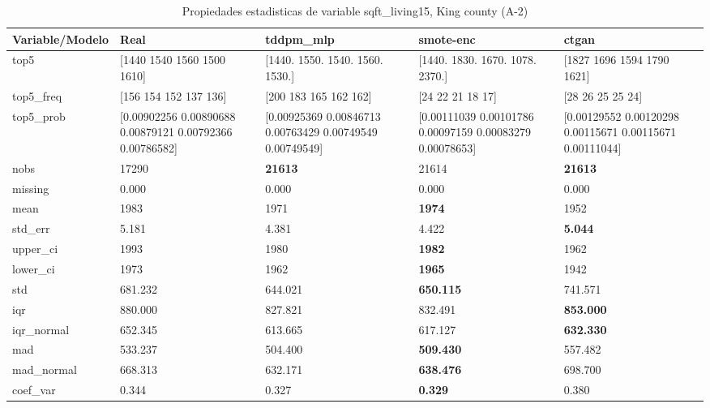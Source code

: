 \begin{table}[H]
\centering
\fontsize{8}{14}\selectfont
\caption{Propiedades  estadisticas de variable sqft\_living15, King county (A-2)}
\label{table-stats-king county-a-2-sqft_living15}
\begin{tabular}{|l|m{10em}|m{10em}|m{10em}|m{10em}|}
\hline
 \rowcolor[gray]{0.8}
Variable/Modelo & Real & tddpm\_mlp & smote-enc & ctgan \\
\hline top5 & [1440 1540 1560 1500 1610] & [1440. 1550. 1540. 1560. 1530.] & [1440. 1830. 1670. 1078. 2370.] & [1827 1696 1594 1790 1621] \\
\hline top5\_freq & [156 154 152 137 136] & [200 183 165 162 162] & [24 22 21 18 17] & [28 26 25 25 24] \\
\hline top5\_prob & [0.00902256 0.00890688 0.00879121 0.00792366 0.00786582] & [0.00925369 0.00846713 0.00763429 0.00749549 0.00749549] & [0.00111039 0.00101786 0.00097159 0.00083279 0.00078653] & [0.00129552 0.00120298 0.00115671 0.00115671 0.00111044] \\
\hline nobs & 17290 & \bfseries 21613 & \cellcolor[rgb]{0.9, 0.54, 0.52} 21614 & \bfseries 21613 \\
\hline missing & 0.000 & 0.000 & 0.000 & 0.000 \\
\hline mean & 1983 & 1971 & \bfseries 1974 & \cellcolor[rgb]{0.9, 0.54, 0.52} 1952 \\
\hline std\_err & 5.181 & \cellcolor[rgb]{0.9, 0.54, 0.52} 4.381 & 4.422 & \bfseries 5.044 \\
\hline upper\_ci & 1993 & 1980 & \bfseries 1982 & \cellcolor[rgb]{0.9, 0.54, 0.52} 1962 \\
\hline lower\_ci & 1973 & 1962 & \bfseries 1965 & \cellcolor[rgb]{0.9, 0.54, 0.52} 1942 \\
\hline std & 681.232 & 644.021 & \bfseries 650.115 & \cellcolor[rgb]{0.9, 0.54, 0.52} 741.571 \\
\hline iqr & 880.000 & \cellcolor[rgb]{0.9, 0.54, 0.52} 827.821 & 832.491 & \bfseries 853.000 \\
\hline iqr\_normal & 652.345 & \cellcolor[rgb]{0.9, 0.54, 0.52} 613.665 & 617.127 & \bfseries 632.330 \\
\hline mad & 533.237 & \cellcolor[rgb]{0.9, 0.54, 0.52} 504.400 & \bfseries 509.430 & 557.482 \\
\hline mad\_normal & 668.313 & \cellcolor[rgb]{0.9, 0.54, 0.52} 632.171 & \bfseries 638.476 & 698.700 \\
\hline coef\_var & 0.344 & 0.327 & \bfseries 0.329 & \cellcolor[rgb]{0.9, 0.54, 0.52} 0.380 \\

\end{tabular}
\end{table}
